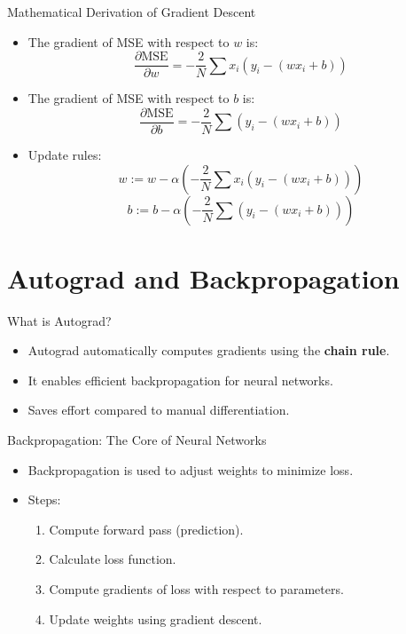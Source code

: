 \documentclass{beamer}
\begin{document}
\begin{frame}{Mathematical Derivation of Gradient Descent}
    \begin{itemize}
        \item The gradient of MSE with respect to \(w\) is:
        \[
        \frac{\partial \text{MSE}}{\partial w} = -\frac{2}{N} \sum x_i (y_i - (wx_i + b))
        \]
        \item The gradient of MSE with respect to \(b\) is:
        \[
        \frac{\partial \text{MSE}}{\partial b} = -\frac{2}{N} \sum (y_i - (wx_i + b))
        \]
        \item Update rules:
        \[
        w := w - \alpha \left( -\frac{2}{N} \sum x_i (y_i - (wx_i + b)) \right)
        \]
        \[
        b := b - \alpha \left( -\frac{2}{N} \sum (y_i - (wx_i + b)) \right)
        \]
    \end{itemize}
\end{frame}

\section{Autograd and Backpropagation}
\begin{frame}{What is Autograd?}
    \begin{itemize}
        \item Autograd automatically computes gradients using the \textbf{chain rule}.
        \item It enables efficient backpropagation for neural networks.
        \item Saves effort compared to manual differentiation.
    \end{itemize}
\end{frame}

\begin{frame}{Backpropagation: The Core of Neural Networks}
    \begin{itemize}
        \item Backpropagation is used to adjust weights to minimize loss.
        \item Steps:
        \begin{enumerate}
            \item Compute forward pass (prediction).
            \item Calculate loss function.
            \item Compute gradients of loss with respect to parameters.
            \item Update weights using gradient descent.
        \end{enumerate}
    \end{itemize}
\end{frame}
\end{document}
